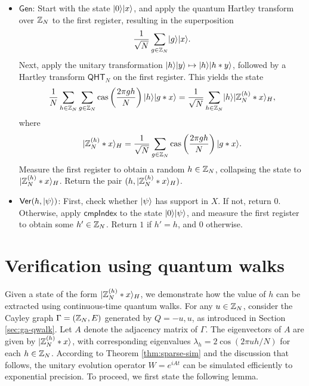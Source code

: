 \documentclass[11pt]{article}
\theoremstyle{definition}
\newcommand{\cas}{\mathrm{cas}}
\newcommand{\qht}{\mathsf{QHT}}
\newcommand{\comph}{\mathsf{cmpIndex}}
\newcommand{\gen}{\mathsf{Gen}}
\newcommand{\ver}{\mathsf{Ver}}
\begin{document}
\begin{itemize}
    \item \textbf{\( \gen \)}: Start with the state \( \lvert0\rangle\lvert x\rangle \), and apply the quantum Hartley transform over \( \mathbb{Z}_N \) to the first register, resulting in the superposition
    \[
    \frac{1}{\sqrt{N}} \sum_{g \in \mathbb{Z}_N} \lvert g\rangle\lvert x\rangle.
    \]
    Next, apply the unitary transformation \( \lvert h\rangle\lvert y\rangle \mapsto \lvert h\rangle\lvert h * y\rangle \), followed by a Hartley transform \( \qht_N \) on the first register. This yields the state
    \[
    \frac{1}{N} \sum_{h \in \Z_N} \sum_{g \in \Z_N} \cas\left(\frac{2\pi gh}{N}\right) \ket{h}\ket{g * x}
    = \frac{1}{\sqrt{N}} \sum_{h \in \Z_N} \ket{h} \ket{\Z_N^{(h)} * x}_H,
    \]
    where
    \[
    \ket{\Z_N^{(h)} * x}_H = \frac{1}{\sqrt{N}} \sum_{g \in \Z_N} \cas\left(\frac{2\pi gh}{N}\right) \ket{g * x}.
    \]
    Measure the first register to obtain a random \( h \in \mathbb{Z}_N \), collapsing the state to \( \lvert\mathbb{Z}_N^{(h)} * x\rangle_H \). Return the pair \( (h, \lvert\mathbb{Z}_N^{(h)} * x\rangle_H) \).

    \item \textbf{\( \ver(h, \ket{\psi}) \)}: First, check whether \( \lvert\psi\rangle \) has support in \( X \). If not, return \( 0 \). Otherwise, apply \( \comph \) to the state \( \lvert0\rangle \lvert\psi\rangle \), and measure the first register to obtain some \( h' \in \mathbb{Z}_N \). Return \( 1 \) if \( h' = h \), and \( 0 \) otherwise.
\end{itemize}


\section*{Verification using quantum walks}


Given a state of the form $\lvert\mathbb{Z}_N^{(h)} * x\rangle_H$, we demonstrate how the value of $h$ can be extracted using continuous-time quantum walks. For any $u \in \mathbb{Z}_N$, consider the Cayley graph $\Gamma = (\mathbb{Z}_N, E)$ generated by $Q = {-u, u}$, as introduced in Section \ref{sec:ga-qwalk}. Let $A$ denote the adjacency matrix of $\Gamma$. The eigenvectors of $A$ are given by $\lvert\mathbb{Z}_N^{(h)} * x\rangle$, with corresponding eigenvalues $\lambda_h = 2\cos(2\pi uh / N)$ for each $h \in \mathbb{Z}_N$. According to Theorem \ref{thm:sparse-sim} and the discussion that follows, the unitary evolution operator $W = e^{iAt}$ can be simulated efficiently to exponential precision. To proceed, we first state the following lemma.
\end{document}
